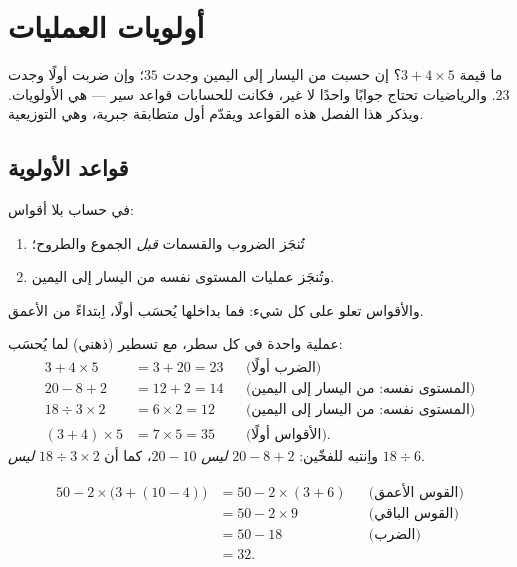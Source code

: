 \chapter{أولويات العمليات}\label{ch:g7:priorities}

ما قيمة $3 + 4 \times 5$؟ إن حسبت من اليسار إلى اليمين وجدت $35$؛
وإن ضربت أولًا وجدت $23$. والرياضيات تحتاج جوابًا واحدًا
لا غير، فكانت للحسابات قواعد سير --- هي الأولويات.
ويذكر هذا الفصل هذه القواعد ويقدّم أول متطابقة جبرية،
وهي التوزيعية.

\section{قواعد الأولوية}

\begin{theorem}\label{thm:g7:priorities:rules}
في حساب بلا أقواس:
\begin{enumerate}
  \item تُنجَز الضروب والقسمات \emph{قبل}
        الجموع والطروح؛
  \item وتُنجَز عمليات المستوى نفسه من اليسار إلى اليمين.
\end{enumerate}
والأقواس تعلو على كل شيء: فما بداخلها يُحسَب
أولًا، اِبتداءً من الأعمق.
\end{theorem}

\begin{example}\label{ex:g7:priorities:basic}
عملية واحدة في كل سطر، مع تسطير (ذهني) لما يُحسَب:
\begin{align*}
3 + 4 \times 5 &= 3 + 20 = 23
&&\text{(الضرب أولًا)}\\
20 - 8 + 2 &= 12 + 2 = 14
&&\text{(المستوى نفسه: من اليسار إلى اليمين)}\\
18 \div 3 \times 2 &= 6 \times 2 = 12
&&\text{(المستوى نفسه: من اليسار إلى اليمين)}\\
(3 + 4) \times 5 &= 7 \times 5 = 35
&&\text{(الأقواس أولًا).}
\end{align*}
واِنتبه للفخّين: $20 - 8 + 2$ \emph{ليس} $20 - 10$،
كما أن $18 \div 3 \times 2$ \emph{ليس} $18 \div 6$.
\end{example}

\begin{example}\label{ex:g7:priorities:nested}
\begin{align*}
50 - 2 \times \bigl(3 + (10 - 4)\bigr)
&= 50 - 2 \times (3 + 6) && \text{(القوس الأعمق)}\\
&= 50 - 2 \times 9 && \text{(القوس الباقي)}\\
&= 50 - 18 && \text{(الضرب)}\\
&= 32 .
\end{align*}
\end{example}

